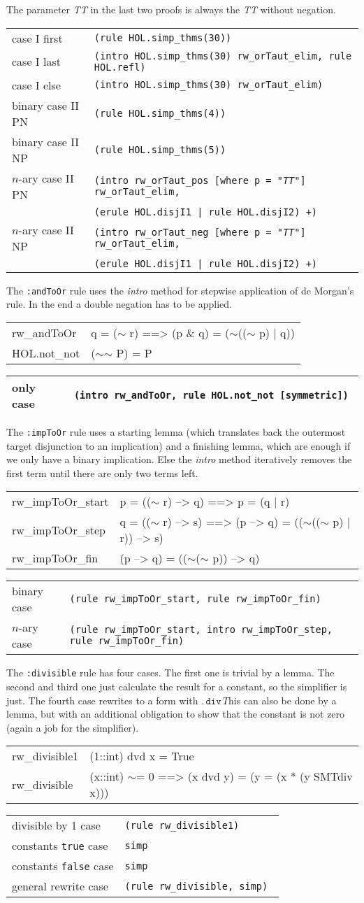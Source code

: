 \documentclass[10pt,a4paper]{article}
\newcommand{\ttt}{\texttt}
\newcommand{\negat}{\ensuremath{\sim}}
\newcommand{\nega}{\negat\xspace}
\newcommand{\TTx}{\emph{TT}}
\newcommand{\TT}{\TTx\xspace}
\newcommand{\smtdiv}[2]{\ensuremath{#1 \, \texttt{div} \, #2}}
\newcommand{\true}{\ttt{true}\xspace}
\newcommand{\false}{\ttt{false}\xspace}
\newenvironment{pt}[1]{\begin{center}\begin{tt}\begin{tabular}{#1}\hline}{\end{tabular}\end{tt}\end{center}}
\newcommand{\pl}[1]{#1 \\[1mm]}
\newcommand{\pll}[1]{#1 \\\hline}
\newenvironment{rt}{\begin{center}\begin{tabular}{|l l|}\hline}{\end{tabular}\end{center}}
\newcommand{\rl}[2]{\rm{#1} & \tt{#2} \\[1mm]}
\newcommand{\rll}[2]{\rm{#1} & \tt{#2} \\\hline}
\def\ind{\quad}
\begin{document}
The parameter \TT in the last two proofs is always the \TT without negation.
%
\begin{rt}
	\rl{case I first}{(rule HOL.simp\_thms(30))}
	\rl{case I last}{(intro HOL.simp\_thms(30) rw\_orTaut\_elim, rule HOL.refl)}
	\rl{case I else}{(intro HOL.simp\_thms(30) rw\_orTaut\_elim)}
	\rl{binary case II PN}{(rule HOL.simp\_thms(4))}
	\rl{binary case II NP}{(rule HOL.simp\_thms(5))}
	\rl{$n$-ary case II PN}{(intro rw\_orTaut\_pos [where p = "\TTx"] rw\_orTaut\_elim,}
		\rl{}{\ind (erule HOL.disjI1 | rule HOL.disjI2) +)}
	\rl{$n$-ary case II NP}{(intro rw\_orTaut\_neg [where p = "\TTx"] rw\_orTaut\_elim,}
		\rll{}{\ind (erule HOL.disjI1 | rule HOL.disjI2) +)}
\end{rt}

The \ttt{:andToOr} rule uses the \emph{intro} method for stepwise application of de Morgan's rule. In the end a double negation has to be applied.
%
\begin{pt}{ll}
	\pl{rw\_andToOr & q = (\nega r) ==> (p \& q) = (\nega ((\nega p) | q))}
	\pll{HOL.not\_not & (\nega \nega P) = P}
\end{pt}
%
\begin{rt}
	\rll{only case}{(intro rw\_andToOr, rule HOL.not\_not [symmetric])}
\end{rt}

The \ttt{:impToOr} rule uses a starting lemma (which translates back the outermost target disjunction to an implication) and a finishing lemma, which are enough if we only have a binary implication. Else the \emph{intro} method iteratively removes the first term until there are only two terms left.
%
\begin{pt}{ll}
	\pl{rw\_impToOr\_start & p = ((\nega r) --> q) ==> p = (q | r)}
	\pl{rw\_impToOr\_step & q = ((\nega r) --> s) ==> (p --> q) = ((\nega ((\nega p) | r)) --> s)}
	\pll{rw\_impToOr\_fin & (p --> q) = ((\nega (\nega p)) --> q)}
\end{pt}
%
\begin{rt}
	\rl{binary case}{(rule rw\_impToOr\_start, rule rw\_impToOr\_fin)}
	\rll{$n$-ary case}{(rule rw\_impToOr\_start, intro rw\_impToOr\_step, rule rw\_impToOr\_fin)}
\end{rt}

The \ttt{:divisible} rule has four cases. The first one is trivial by a lemma. The second and third one just calculate the result for a constant, so the simplifier is just. The fourth case rewrites to a form with \smtdiv. This can also be done by a lemma, but with an additional obligation to show that the constant is not zero (again a job for the simplifier).
%
\begin{pt}{ll}
	\pl{rw\_divisible1 & (1::int) dvd x = True}
	\pll{rw\_divisible & (x::int) \negat= 0 ==> (x dvd y) = (y = (x * (y SMTdiv x)))}
\end{pt}
%
\begin{rt}
	\rl{divisible by 1 case}{(rule rw\_divisible1)}
	\rl{constants \true case}{simp}
	\rl{constants \false case}{simp}
	\rll{general rewrite case}{(rule rw\_divisible, simp)}
\end{rt}
\end{document}
